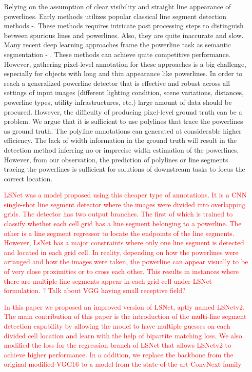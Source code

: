 \documentclass[journal]{IEEEtran}
\begin{document}
Relying on the assumption of clear visibility and straight line appearance of powerlines. Early methods utilizes popular classical line segment detection methods \cite{} -\cite{}. These methods requires intricate post processing steps to distinguish between spurious lines and powerlines. Also, they are quite inaccurate and slow. Many recent deep learning approaches frame the powerline task as semantic segmentation \cite{} - \cite{}. These methods can achieve quite competitive performance. However, gathering pixel-level annotation for these approaches is a big challenge, especially for objects with long and thin appearance like powerlines. In order to reach a generalized powerline detector that is effective and robust across all settings of input images (different lighting condition, scene variations, distances, powerline types, utility infrastructures, etc.) large amount of data should be procured. However, the difficulty of producing pixel-level ground truth can be a problem. We argue that it is sufficient to use polylines that trace the powerlines as ground truth. The polyline annotations can generated at considerable higher efficiency. The lack of width information in the ground truth will result in the detection method inferring no or imprecise width estimation of the powerlines. However, from our observation, the prediction of polylines or line segments tracing the powerlines is sufficient for solutions of downstream tasks to focus the correct location.

\textcolor{red}{LSNet \cite{Nguyen2020} was a model proposed using this cheaper type of annotations. It is a CNN single-shot line segment detector where the images were divided into overlapping grids. The detector has two output branches. The first of which is trained to classify whether each cell grid has a line segment belonging to a powerline. The other is a line
segment regressor to locate the endpoints of the line segments. However, LsNet has a major constraints where only one line segment is detected and located in each grid cell. In reality, depending on how the powerlines were arranged and how the images were taken, the powerline can appear visually to be of very close proximities or to cross each other. This results in instances where there are multiple line segments appear in each grid cell under LSNet formulation. ? Talk about VGG having small receptive field?}

\textcolor{red}{In this paper we proposed an improved version of LSNet, aptly named LSNetv2. The main contribution of this paper is the introduction of the multi-line segment detection capability by allowing the model to have multiple guesses on each divided cell location and learn with the help of bipartite matching loss. We also modified the loss for the regression branch of LSNet that allows LSNetv2 to achieve higher performance. In a addition, we replace the backbone from the original modified-VGG16 \cite{} to a model from the state-of-the-art ConvNext family \cite{}}
\end{document}
